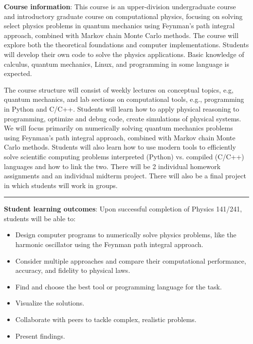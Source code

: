 \documentclass[12pt]{article}
\begin{document}
\noindent\textbf{Course information}: This course is an upper-division undergraduate course and introductory graduate course on computational physics, focusing on solving select physics problems in quantum mechanics using Feynman's path integral approach, combined with Markov chain Monte Carlo methods.
The course will explore both the theoretical foundations and computer implementations.
Students will develop their own code to solve the physics applications.
Basic knowledge of calculus, quantum mechanics, Linux, and programming in some language is expected.

The course structure will consist of weekly lectures on conceptual topics, e.g, quantum mechanics, and lab sections on computational tools, e.g., programming in Python and C/C++.
Students will learn how to apply physical reasoning to programming, optimize and debug code, create simulations of physical systems.
We will focus primarily on numerically solving quantum mechanics problems using Feynman's path integral approach, combined with Markov chain Monte Carlo methods.
Students will also learn how to use modern tools to efficiently solve scientific computing problems interpreted (Python) vs. compiled (C/C++) languages and how to link the two.
There will be 2 individual homework assignments and an individual midterm project.
There will also be a final project in which students will work in groups.

\begin{center}
  \rule{\textwidth}{0.5pt}
\end{center}

\noindent\textbf{Student learning outcomes}: Upon successful completion of Physics 141/241, students will be able to:
\begin{itemize}
  \item Design computer programs to numerically solve physics problems, like the harmonic oscillator using the Feynman path integral approach.
  \item Consider multiple approaches and compare their computational performance, accuracy, and fidelity to physical laws.
  \item Find and choose the best tool or programming language for the task.
  \item Visualize the solutions.
  \item Collaborate with peers to tackle complex, realistic problems.
  \item Present findings.
\end{itemize}
\end{document}
